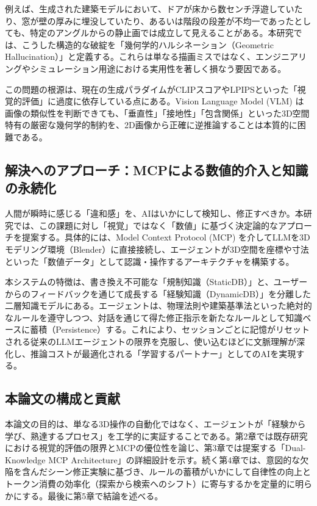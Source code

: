 \documentclass{deimj}
\begin{document}
例えば、生成された建築モデルにおいて、ドアが床から数センチ浮遊していたり、窓が壁の厚みに埋没していたり、あるいは階段の段差が不均一であったとしても、特定のアングルからの静止画では成立して見えることがある。本研究では、こうした構造的な破綻を「幾何学的ハルシネーション（Geometric Hallucination）」と定義する。これらは単なる描画ミスではなく、エンジニアリングやシミュレーション用途における実用性を著しく損なう要因である。

この問題の根源は、現在の生成パラダイムがCLIPスコア\cite{radford2021clip}やLPIPS\cite{zhang2018lpips}といった「視覚的評価」に過度に依存している点にある。Vision Language Model (VLM) は画像の類似性を判断できても、「垂直性」「接地性」「包含関係」といった3D空間特有の厳密な幾何学的制約を、2D画像から正確に逆推論することは本質的に困難である。

\subsection{解決へのアプローチ：MCPによる数値的介入と知識の永続化}

人間が瞬時に感じる「違和感」を、AIはいかにして検知し、修正すべきか。本研究では、この課題に対し「視覚」ではなく「数値」に基づく決定論的なアプローチを提案する。具体的には、Model Context Protocol (MCP)\cite{anthropic2024mcp} を介してLLMを3Dモデリング環境（Blender）に直接接続し、エージェントが3D空間を座標や寸法といった「数値データ」として認識・操作するアーキテクチャを構築する。

本システムの特徴は、書き換え不可能な「規制知識（StaticDB）」と、ユーザーからのフィードバックを通じて成長する「経験知識（DynamicDB）」を分離した二層知識モデルにある。エージェントは、物理法則や建築基準法といった絶対的なルールを遵守しつつ、対話を通じて得た修正指示を新たなルールとして知識ベースに蓄積（Persistence）する。これにより、セッションごとに記憶がリセットされる従来のLLMエージェントの限界を克服し、使い込むほどに文脈理解が深化し、推論コストが最適化される「学習するパートナー」としてのAIを実現する。

\subsection{本論文の構成と貢献}

本論文の目的は、単なる3D操作の自動化ではなく、エージェントが「経験から学び、熟達するプロセス」を工学的に実証することである。第2章では既存研究における視覚的評価の限界とMCPの優位性を論じ、第3章では提案する「Dual-Knowledge MCP Architecture」の詳細設計を示す。続く第4章では、意図的な欠陥を含んだシーン修正実験に基づき、ルールの蓄積がいかにして自律性の向上とトークン消費の効率化（探索から検索へのシフト）に寄与するかを定量的に明らかにする。最後に第5章で結論を述べる。
\end{document}
